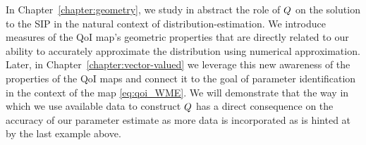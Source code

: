In Chapter~\ref{chapter:geometry}, we study in abstract the role of $Q$ on the solution to the SIP in the natural context of distribution-estimation.
We introduce measures of the QoI map's geometric properties that are directly related to our ability to accurately approximate the distribution using numerical approximation.
Later, in Chapter~\ref{chapter:vector-valued} we leverage this new awareness of the properties of the QoI maps and connect it to the goal of parameter identification in the context of the map \eqref{eq:qoi_WME}.
We will demonstrate that the way in which we use available data to construct $Q$ has a direct consequence on the accuracy of our parameter estimate as more data is incorporated as is hinted at by the last example above.
